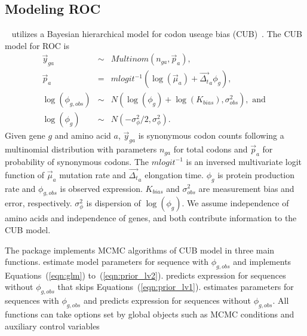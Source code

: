 \subsection[Modeling ROC]{Modeling ROC}
\label{sec:roc_model}

~\citep{Chen2014cubfitspackage} utilizes a
Bayesian hierarchical model for codon useage bias
(CUB)~\citep{Gilchrist2007,Shah2011,Wallace2013,Gilchrist2014}.
The CUB model for ROC is
\begin{eqnarray}
\vec{y}_{ga} &
    \sim & Multinom(n_{ga}, \vec{p}_{a}),
    \label{eqn:glm} \\
\vec{p}_{a} & = &
    mlogit^{-1}(\log(\vec{\mu}_{a}) + \vec{\Delta_t}_{a} \phi_g),
    \label{eqn:link_fcn} \\
\log(\phi_{g, obs}) & \sim &
    N(\log(\phi_g) + \log(K_{bias}), \sigma^2_{obs}),  \mbox{ and }
    \label{eqn:prior_lv1} \\
\log(\phi_g) & \sim &
    N(-\sigma^2_{\phi}/2, \sigma^2_{\phi}).
    \label{eqn:prior_lv2}
\end{eqnarray}
Given gene $g$ and amino acid $a$,
$\vec{y}_{ga}$ is synonymous codon counts
following a multinomial distribution with parameters
$n_{ga}$ for total codons and $\vec{p}_{a}$ for probability of
synonymous codons.
The $mlogit^{-1}$ is an inversed multivariate logit
function of $\vec{\mu}_{a}$ mutation rate and $\vec{\Delta_t}_{a}$
elongation time. $\phi_g$ is protein production rate 
and $\phi_{g,obs}$ is observed expression.
$K_{bias}$ and $\sigma^2_{obs}$ are measurement bias and
error, respectively. $\sigma^2_{\phi}$ is dispersion of $\log(\phi_g)$.
We assume independence of amino acids and independence of genes, and both
contribute information to the CUB model.

The package implements MCMC algorithms of CUB model in three main functions.
 estimate model parameters for sequence with $\phi_{g,obs}$
and implements Equations~(\ref{eqn:glm}) to~(\ref{eqn:prior_lv2}).
 predicts expression for sequences without $\phi_{g,obs}$
that skips Equations~(\ref{eqn:prior_lv1}).
 estimates parameters for sequences with $\phi_{g,obs}$
and predicts expression for sequences without $\phi_{g,obs}$.
All functions can take options set by global objects such as
MCMC conditions and auxiliary control variables

